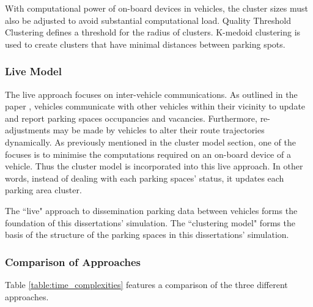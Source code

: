 With computational power of on-board devices in vehicles, the cluster sizes must also be adjusted to avoid substantial computational load. Quality Threshold Clustering defines a threshold for the radius of clusters. K-medoid clustering is used to create clusters that have minimal distances between parking spots.

\subsubsection{Live Model}\label{sssec:live}
The live approach focuses on inter-vehicle communications. As outlined in the paper \citep{Verroios2011ReachingNetworking}, vehicles communicate with other vehicles within their vicinity to update and report parking spaces occupancies and vacancies. Furthermore, re-adjustments may be made by vehicles to alter their route trajectories dynamically. As previously mentioned in the cluster model section, one of the focuses is to minimise the computations required on an on-board device of a vehicle. Thus the cluster model is incorporated into this live approach. In other words, instead of dealing with each parking spaces' status, it updates each parking area cluster.

The ``live" approach to dissemination parking data between vehicles forms the foundation of this dissertations' simulation. The ``clustering model" forms the basis of the structure of the parking spaces in this dissertations' simulation.

\subsubsection*{Comparison of Approaches}
Table \ref{table:time_complexities} features a comparison of the three different approaches. 


